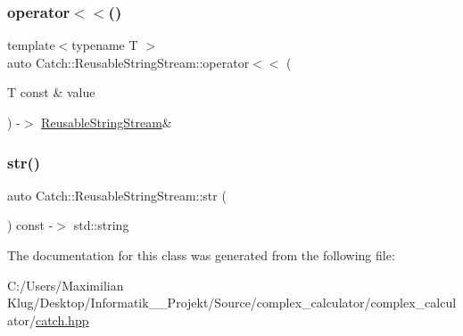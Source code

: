 \mbox{\label{class_catch_1_1_reusable_string_stream_af95f72024c082db70e5e50782e28e4f6}} 
\subsubsection{\texorpdfstring{operator$<$$<$()}{operator<<()}}
{\footnotesize\ttfamily template$<$typename T $>$ \\
auto Catch\+::\+Reusable\+String\+Stream\+::operator$<$$<$ (\begin{DoxyParamCaption}\item[{T const \&}]{value }\end{DoxyParamCaption}) -\/$>$ \mbox{\hyperlink{class_catch_1_1_reusable_string_stream}{Reusable\+String\+Stream}}\& \hspace{0.3cm}{\ttfamily [inline]}}

\mbox{\label{class_catch_1_1_reusable_string_stream_a0e9ecf260b2a5d35f4886ef0d51f6270}} 
\subsubsection{\texorpdfstring{str()}{str()}}
{\footnotesize\ttfamily auto Catch\+::\+Reusable\+String\+Stream\+::str (\begin{DoxyParamCaption}{ }\end{DoxyParamCaption}) const -\/$>$  std\+::string}



The documentation for this class was generated from the following file\+:\begin{DoxyCompactItemize}
\item 
C\+:/\+Users/\+Maximilian Klug/\+Desktop/\+Informatik\+\_\+\_\+\+Projekt/\+Source/complex\+\_\+calculator/complex\+\_\+calculator/\mbox{\hyperlink{catch_8hpp}{catch.\+hpp}}\end{DoxyCompactItemize}
